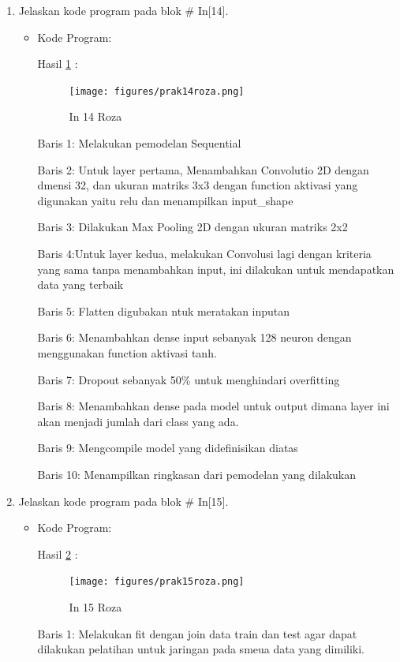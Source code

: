 \begin{enumerate}
\item Jelaskan kode program pada blok \# In[14].
\begin{itemize}
\item Kode Program:

\par Hasil \ref{in14roza} :
\begin{figure}[!hbtp]
\centering
\texttt{[image: figures/prak14roza.png]}
\caption{In 14 Roza}
\label{in14roza}
\end{figure}
\par Baris 1: Melakukan pemodelan Sequential
\par Baris 2: Untuk layer pertama, Menambahkan Convolutio 2D dengan dmensi 32, dan ukuran matriks 3x3 dengan function aktivasi yang digunakan yaitu relu dan menampilkan input\_shape
\par Baris 3: Dilakukan Max Pooling 2D dengan ukuran matriks 2x2
\par Baris 4:Untuk layer kedua, melakukan Convolusi lagi dengan kriteria yang sama tanpa menambahkan input, ini dilakukan untuk mendapatkan data yang terbaik
\par Baris 5:  Flatten digubakan ntuk meratakan inputan
\par Baris 6: Menambahkan dense input sebanyak 128 neuron dengan menggunakan function aktivasi tanh.
\par Baris 7: Dropout sebanyak 50\% untuk menghindari overfitting
\par Baris 8: Menambahkan dense pada model untuk output dimana layer ini akan menjadi jumlah dari class yang ada.
\par Baris 9: Mengcompile model yang didefinisikan diatas
\par Baris 10: Menampilkan ringkasan dari pemodelan yang dilakukan
\end{itemize}
\par

\item Jelaskan kode program pada blok \# In[15].
\begin{itemize}
\item Kode Program:

\par Hasil \ref{in15roza} :
\begin{figure}[!hbtp]
\centering
\texttt{[image: figures/prak15roza.png]}
\caption{In 15 Roza}
\label{in15roza}
\end{figure}
\par Baris 1: Melakukan fit dengan join data train dan test agar dapat dilakukan pelatihan untuk jaringan pada smeua data yang dimiliki.
\end{itemize}
\par


\end{enumerate}
